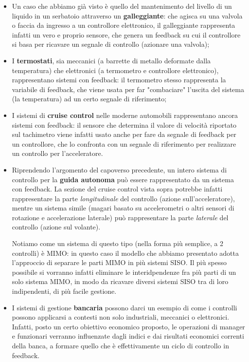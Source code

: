 \documentclass[a4paper,11pt]{article}
\begin{document}
\begin{itemize}
	\item Un caso che abbiamo già visto è quello del mantenimento del livello di un liquido in un serbatoio attraverso un \textbf{galleggiante}: che agisca su una valvola o faccia da ingresso a un controllore elettronico, il galleggiante rappresenta infatti un vero e proprio sensore, che genera un feedback su cui il controllore si basa per ricavare un segnale di controllo (azionare una valvola);
	\item I \textbf{termostati}, sia meccanici (a barrette di metallo deformate dalla temperatura) che elettronici (a termometro e controllore elettronico), rappresentano sistemi con feedback: il termometro stesso rappresenta la variabile di feedback, che viene usata per far "combaciare" l'uscita del sistema (la temperatura) ad un certo segnale di riferimento;
	\item I sistemi di \textbf{cruise control} nelle moderne automobili rappresentano ancora sistemi con feedback: il sensore che determina il valore di velocità riportato sul tachimetro viene infatti usato anche per fare da segnale di feedback per un controllore, che lo confronta con un segnale di riferimento per realizzare un controllo per l'acceleratore. 
	\item Riprendendo l'argomento del capoverso precedente, un intero sistema di controllo per la \textbf{guida autonoma} può essere rappresentato da un sistema con feedback.
		La sezione del cruise control vista sopra potrebbe infatti rappresentare la parte \textit{longitudinale} del controllo (azione sull'acceleratore), mentre un sistema simile (magari basato su accelerometri o altri sensori di rotazione e accelerazione laterale) può rappresentare la parte \textit{laterale} del controllo (azione sul volante).

		Notiamo come un sistema di questo tipo (nella forma più semplice, a 2 controlli) è MIMO: in questo caso il modello che abbiamo presentato adotta l'approccio di separare le parti MIMO in più sistemi SISO.
		Il più spesso possibile si vorranno infatti eliminare le interidpendenze fra più parti di un solo sistema MIMO, in modo da ricavare diversi sistemi SISO tra di loro indipendenti, di più facile gestione.

	\item I sistemi di gestione \textbf{bancaria} possono darci un esempio di come i controlli possono applicarsi a contesti non solo industriali, meccanici o elettronici.	Infatti, posto un certo obiettivo economico proposto, le operazioni di manager e funzionari verranno influenzate dagli indici e dai risultati economici correnti della banca, a formare quello che è effettivamente un ciclo di controllo in feedback.


\end{itemize}
\end{document}
